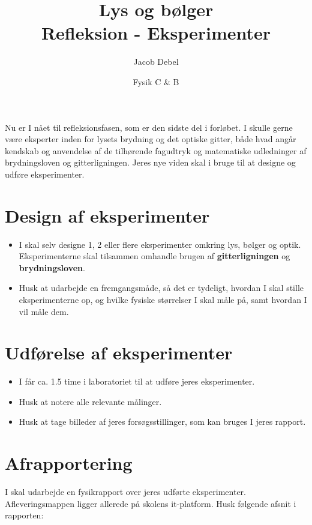 \documentclass[a4paper, 12pt]{article}
\author{Jacob Debel}
\date{Fysik C \& B}
\title{Lys og bølger\\\medskip
\large Refleksion - Eksperimenter}
\begin{document}
\maketitle
Nu er I nået til refleksionsfasen, som er den sidste del i forløbet. I skulle gerne være eksperter inden for lysets brydning og det optiske gitter, både hvad angår kendskab og anvendelse af de tilhørende fagudtryk og matematiske udledninger af brydningsloven og gitterligningen. Jeres nye viden skal i bruge til at designe og udføre eksperimenter.

\section*{Design af eksperimenter}
\label{sec:org2356382}

\begin{itemize}
\item I skal selv designe 1, 2 eller flere eksperimenter omkring lys, bølger og optik. Eksperimenterne skal tilsammen omhandle brugen af \textbf{gitterligningen} og \textbf{brydningsloven}.

\item Husk at udarbejde en fremgangsmåde, så det er tydeligt, hvordan I skal stille eksperimenterne op, og hvilke fysiske størrelser I skal måle på, samt hvordan I vil måle dem.
\end{itemize}

\section*{Udførelse af eksperimenter}
\label{sec:orge6d6f94}

\begin{itemize}
\item I får ca. 1.5 time i laboratoriet til at udføre jeres eksperimenter.

\item Husk at notere alle relevante målinger.

\item Husk at tage billeder af jeres forsøgsstillinger, som kan bruges I jeres rapport.
\end{itemize}

\newpage

\section*{Afrapportering}
\label{sec:org2e2c421}

I skal udarbejde en fysikrapport over jeres udførte eksperimenter. Afleveringsmappen ligger allerede på skolens it-platform. Husk følgende afsnit i rapporten:
\end{document}
